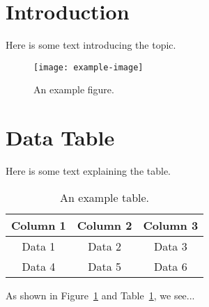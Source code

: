 \documentclass{article}
\begin{document}
	
	\tableofcontents
	
	\section{Introduction}
	Here is some text introducing the topic.
	
	\begin{figure}[h!]
		\centering
		\texttt{[image: example-image]} %
		\caption{An example figure.}
		\label{fig:example}
	\end{figure}
	
	\newpage %
	
	\section{Data Table}
	Here is some text explaining the table.
	
	\begin{table}[h!]
		\centering
		\begin{tabular}{|c|c|c|}
			\hline
			Column 1 & Column 2 & Column 3 \\
			\hline
			Data 1   & Data 2   & Data 3   \\
			\hline
			Data 4   & Data 5   & Data 6   \\
			\hline
		\end{tabular}
		\caption{An example table.}
		\label{tab:example}
	\end{table}
	
	As shown in Figure~\ref{fig:example} and Table~\ref{tab:example}, we see...
	
\end{document}
